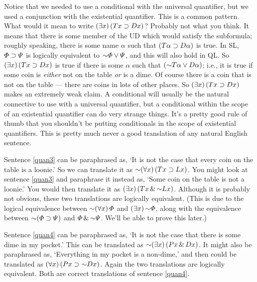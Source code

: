 Notice that we needed to use a conditional with the universal quantifier, but we used a conjunction with the existential quantifier. This is a common pattern. What would it mean to write $(\exists x) \,(Tx \supset Dx)$? Probably not what you think. It means that there is some member of the UD which would satisfy the subformula; roughly speaking, there is some name $\alpha$ such that $(T\alpha \supset D\alpha)$ is true. In SL, $\varPhi{} \supset \varPsi{}$ is logically equivalent to $\enot\metaA{} \eor \metaB{}$, and this will also hold in QL. So $(\exists x) \,(Tx \supset Dx)$ is true if there is some $\alpha$ such that $(\enot T\alpha \eor D\alpha)$; i.e., it is true if some coin is \emph{either} not on the table \emph{or} is a dime. Of course there is a coin that is not on the table --- there are coins in lots of other places. So $(\exists x) \,(Tx \supset Dx)$ makes an extremely weak claim. A conditional will usually be the natural connective to use with a universal quantifier, but a conditional within the scope of an existential quantifier can do very strange things. It's a pretty good rule of thumb that you shouldn't be putting conditionals in the scope of existential quantifiers. This is pretty much never a good translation of any natural English sentence.

Sentence \ref{quan3} can be paraphrased as, `It is not the case that every coin on the table is a loonie.' So we can translate it as $\enot \qt{\forall}{x}(Tx \eif Lx)$. You might look at sentence \ref{quan3} and paraphrase it instead as, `Some coin on the table is not a loonie.' You would then translate it as $\qt{\exists}{x}(Tx \eand \enot Lx)$. Although it is probably not obvious, these two translations are logically equivalent. (This is due to the logical equivalence between $\enot\qt{\forall}{x}\metaA{}$ and $\qt{\exists}{x}\enot\metaA{}$, along with the equivalence between $\enot(\metaA{}\eif\metaB{})$ and $\metaA{}\eand\enot\metaB{}$. We'll be able to prove this later.)

Sentence \ref{quan4} can be paraphrased as, `It is not the case that there is some dime in my pocket.' This can be translated as $\enot\qt{\exists}{x}(Px \eand Dx)$. It might also be paraphrased as, `Everything in my pocket is a non-dime,' and then could be translated as $\qt{\forall}{x}(Px \eif \enot Dx)$. Again the two translations are logically equivalent. Both are correct translations of sentence \ref{quan4}.

